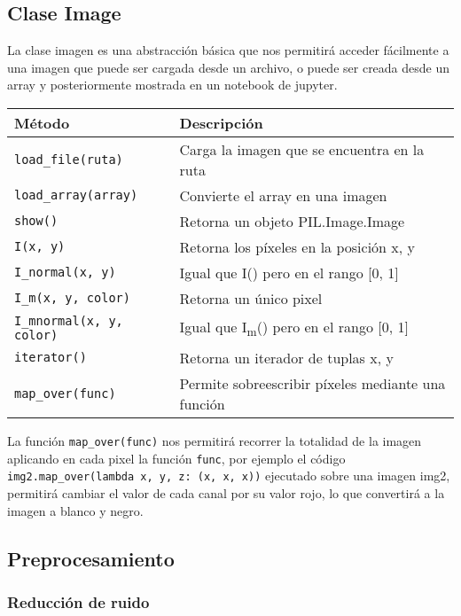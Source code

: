 \documentclass[letter]{article}
\begin{document}
\subsection{Clase Image}
\label{sec:orgbf98c20}
La clase imagen es una abstracción básica que nos permitirá acceder fácilmente a
una imagen que puede ser cargada desde un archivo, o puede ser creada desde un
array y posteriormente mostrada en un notebook de jupyter.

\begin{center}
\begin{tabular}{ll}
Método & Descripción\\
\hline
\texttt{load\_file(ruta)} & Carga la imagen que se encuentra en la ruta\\
\texttt{load\_array(array)} & Convierte el array en una imagen\\
\texttt{show()} & Retorna un objeto PIL.Image.Image\\
\texttt{I(x, y)} & Retorna los píxeles en la posición x, y\\
\texttt{I\_normal(x, y)} & Igual que I() pero en el rango [0, 1]\\
\texttt{I\_m(x, y, color)} & Retorna un único pixel\\
\texttt{I\_mnormal(x, y, color)} & Igual que I\textsubscript{m}() pero en el rango [0, 1]\\
\texttt{iterator()} & Retorna un iterador de tuplas x, y\\
\texttt{map\_over(func)} & Permite sobreescribir píxeles mediante una función\\
\end{tabular}
\end{center}

La función \texttt{map\_over(func)} nos permitirá recorrer la totalidad de la imagen
aplicando en cada pixel la función \texttt{func}, por ejemplo el código
\texttt{img2.map\_over(lambda x, y, z: (x, x, x))} ejecutado sobre una imagen img2,
permitirá cambiar el valor de cada canal por su valor rojo, lo que convertirá a
la imagen a blanco y negro.

\subsection{Preprocesamiento}
\label{sec:org0abca92}

\subsubsection{Reducción de ruido}
\label{sec:orge5cbfa4}
\end{document}

